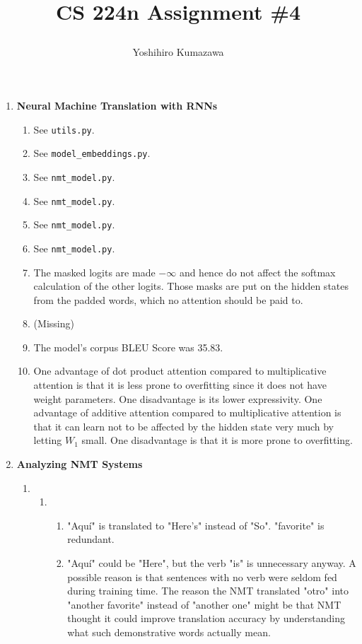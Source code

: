 \documentclass[12pt]{article}
\title{
  \vspace{-2cm}
  CS 224n Assignment \#4 \\
  \author{Yoshihiro Kumazawa}
}
\begin{document}
\maketitle
\begin{enumerate}[label=\textbf{\arabic*.}]
  \item \textbf{Neural Machine Translation with RNNs}
  \begin{enumerate}[label=(\alph*)]
    \item See \texttt{utils.py}.
    \item See \texttt{model\_embeddings.py}.
    \item See \texttt{nmt\_model.py}.
    \item See \texttt{nmt\_model.py}.
    \item See \texttt{nmt\_model.py}.
    \item See \texttt{nmt\_model.py}.
    \item The masked logits are made $-\infty$ and hence do not affect the softmax calculation of the other logits. Those masks are put on the hidden states from the padded words, which no attention should be paid to.
    \item (Missing)
    \item The model’s corpus BLEU Score was 35.83.
    \item One advantage of dot product attention compared to multiplicative attention is that it is less prone to overfitting since it does not have weight parameters. One disadvantage is its lower expressivity. One advantage of additive attention compared to multiplicative attention is that it can learn not to be affected by the hidden state very much by letting $W_1$ small. One disadvantage is that it is more prone to overfitting.
  \end{enumerate}
  \item \textbf{Analyzing NMT Systems}
  \begin{enumerate}[label=(\alph*)]
    \item
    \begin{enumerate}[label=\roman*.]
      \item
      \begin{enumerate}[label=\arabic*.]
        \item "Aquí" is translated to "Here's" instead of "So". "favorite" is redundant.
        \item "Aquí" could be "Here", but the verb "is" is unnecessary anyway. A possible reason is that sentences with no verb were seldom fed during training time. The reason the NMT translated "otro" into "another favorite" instead of "another one" might be that NMT thought it could improve translation accuracy by understanding what such demonstrative words actually mean.

\end{enumerate}
\end{enumerate}
\end{enumerate}
\end{enumerate}
\end{document}
